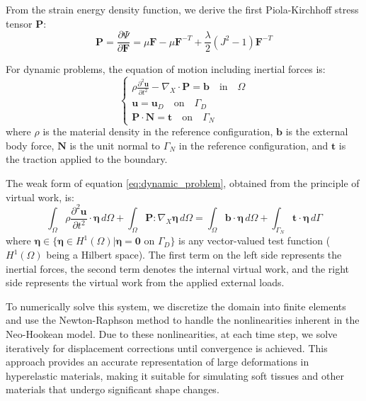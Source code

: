 From the strain energy density function, we derive the first Piola-Kirchhoff stress tensor $\bm{P}$:
\begin{equation}
    \bm{P} = \frac{\partial \Psi}{\partial \bm{F}} = \mu \bm{F} - \mu \bm{F}^{-T} + \frac{\lambda}{2}(J^2-1)\bm{F}^{-T}
\label{eq:piola_stress}
\end{equation}

For dynamic problems, the equation of motion including inertial forces is:
\begin{equation}
    \begin{cases}
        \rho \frac{\partial^2 \bm{u}}{\partial t^2} - \nabla_X \cdot \bm{P} = \bm{b} \quad \text{in} \quad \Omega \\
        \bm{u} = \bm{u}_D \quad \text{on} \quad \Gamma_D \\
        \bm{P} \cdot \bm{N} = \bm{t} \quad \text{on} \quad \Gamma_N
    \end{cases}
\label{eq:dynamic_problem}
\end{equation}
where $\rho$ is the material density in the reference configuration, $\bm{b}$ is the external body force, $\bm{N}$ is the unit normal to $\Gamma_N$ in the reference configuration, and $\bm{t}$ is the traction applied to the boundary.

The weak form of equation \eqref{eq:dynamic_problem}, obtained from the principle of virtual work, is:
\begin{equation}
    \int_{\Omega} \rho \frac{\partial^2 \bm{u}}{\partial t^2} \cdot \bm{\eta} \, d\Omega + \int_{\Omega} \bm{P} : \nabla_X \bm{\eta} \, d\Omega = \int_{\Omega} \bm{b} \cdot \bm{\eta} \, d\Omega + \int_{\Gamma_N} \bm{t} \cdot \bm{\eta} \, d\Gamma
\label{eq:weak_form}
\end{equation}
where $\bm{\eta} \in \{\bm{\eta} \in H^1(\Omega) | \bm{\eta} = \bm{0} \text{ on } \Gamma_D\}$ is any vector-valued test function ($H^1(\Omega)$ being a Hilbert space). The first term on the left side represents the inertial forces, the second term denotes the internal virtual work, and the right side represents the virtual work from the applied external loads.

To numerically solve this system, we discretize the domain into finite elements and use the Newton-Raphson method to handle the nonlinearities inherent in the Neo-Hookean model. Due to these nonlinearities, at each time step, we solve iteratively for displacement corrections until convergence is achieved. This approach provides an accurate representation of large deformations in hyperelastic materials, making it suitable for simulating soft tissues and other materials that undergo significant shape changes.